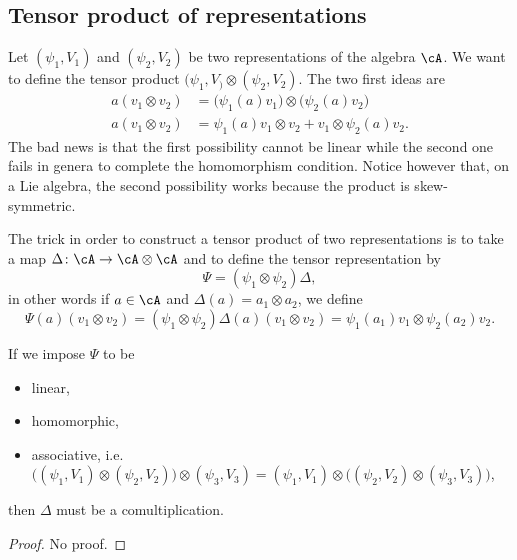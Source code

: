 \subsection{Tensor product of representations}

Let $(\psi_1,V_1)$ and $(\psi_2,V_2)$ be two representations of the algebra $\cA$. We want to define the tensor product $(\psi_1,V_)\otimes(\psi_2,V_2)$. The two first ideas are
\begin{subequations}
	\begin{align}
		a(v_1\otimes v_2) & =\big( \psi_1(a)v_1 \big)\otimes\big( \psi_2(a)v_2 \big) \\
		a(v_1\otimes v_2) & =\psi_1(a)v_1\otimes v_2+v_1\otimes \psi_2(a)v_2.
	\end{align}
\end{subequations}
The bad news is that the first possibility cannot be linear while the second one fails in genera to complete the homomorphism condition. Notice however that, on a Lie algebra, the second possibility works because the product is skew-symmetric.

The trick in order to construct a tensor product of two representations is to take a map $\Delta\colon \cA\to \cA\otimes\cA$ and to define the tensor representation by
\begin{equation}
	\Psi=(\psi_1\otimes\psi_2)\Delta,
\end{equation}
in other words if $a\in\cA$ and $\Delta(a)=a_1\otimes a_2$, we define
\begin{equation}
	\Psi(a)(v_1\otimes v_2)=(\psi_1\otimes\psi_2)\Delta(a)(v_1\otimes v_2)=\psi_1(a_1)v_1\otimes\psi_2(a_2)v_2.
\end{equation}

\begin{proposition}
	If we impose $\Psi$ to be
	\begin{itemize}
		\item linear,
		\item homomorphic,
		\item associative, i.e. $\big((\psi_1,V_1)\otimes(\psi_2,V_2)\big)\otimes(\psi_3,V_3)=(\psi_1,V_1)\otimes\big( (\psi_2,V_2)\otimes(\psi_3,V_3)\big)$,
	\end{itemize}
	then $\Delta$ must be a comultiplication.
\end{proposition}
\begin{proof}
	No proof.
\end{proof}

